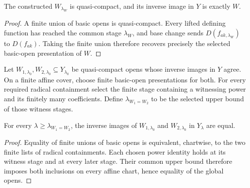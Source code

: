 \begin{lemma}
  \label{lemma:nagata-qc-open-descends}

  The constructed $W_{\lambda_W}$ is quasi-compact, and its inverse image in
  $Y$ is exactly $W$.
\end{lemma}

\begin{proof}
  A finite union of basic opens is quasi-compact.  Every lifted defining
  function has reached the common stage $\lambda_W$, and base change sends
  $D(f_{ak,\lambda_W})$ to $D(f_{ak})$.  Taking the finite union therefore
  recovers precisely the selected basic-open presentation of $W$.
\end{proof}

\begin{definition}
  \label{def:nagata-qc-open-equality-stage}

  Let $W_{1,\lambda_0},W_{2,\lambda_0}\subseteq Y_{\lambda_0}$ be
  quasi-compact opens whose inverse images in $Y$ agree.  On a finite affine
  cover, choose finite basic-open presentations for both.  For every required
  radical containment select the finite stage containing a witnessing power
  and its finitely many coefficients.  Define
  $\lambda_{W_1=W_2}$ to be the selected upper bound of those witness stages.
\end{definition}

\begin{lemma}
  \label{lemma:nagata-qc-open-eq-eventually}

  For every $\lambda\geq\lambda_{W_1=W_2}$, the inverse images of
  $W_{1,\lambda_0}$ and $W_{2,\lambda_0}$ in $Y_\lambda$ are equal.
\end{lemma}

\begin{proof}
  Equality of finite unions of basic opens is equivalent, chartwise, to the
  two finite lists of radical containments.  Each chosen power identity holds
  at its witness stage and at every later stage.  Their common upper bound
  therefore imposes both inclusions on every affine chart, hence equality of
  the global opens.
\end{proof}


